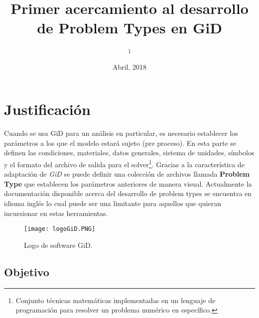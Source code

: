 \documentclass[10pt, a4paper, twocolumn]{article}
\title{Primer acercamiento al desarrollo de Problem Types en GiD}
\author{
	\authorstyle{Luis G. Yáñez Rodríguez\textsuperscript{1}} %
	\newline\newline
	\textsuperscript{1}\institution{[Aula CIMNE-UG] Universidad de Guanajuato, Guanajuato, México}\\
}
\date{Abril, 2018}
\begin{document}
\maketitle

\thispagestyle{firstpage}



\section{Justificación}

Cuando se usa GiD para un análisis en particular, es necesario establecer los parámetros a los que el modelo estará sujeto (pre proceso). En esta parte se definen las condiciones, materiales, datos generales, sistema de unidades, símbolos y el formato del archivo de salida para el solver\footnote{Conjunto técnicas matemáticas implementadas en un lenguaje de programación para resolver un problema numérico en específico.}. Gracias a la característica de adaptación de \textit{GiD} se puede definir una colección de archivos llamada \textbf{Problem Type} que establecen los parámetros anteriores de manera visual. Actualmente la documentación disponible acerca del desarrollo de problem types se encuentra en idioma inglés lo cual puede ser una limitante para aquellos que quieran incursionar en estas herramientas. 

\begin{figure}[hbt!]\centering
	\texttt{[image: logoGiD.PNG]}
	\caption{Logo de software GiD.}
\end{figure}

\subsection{Objetivo}
\end{document}
